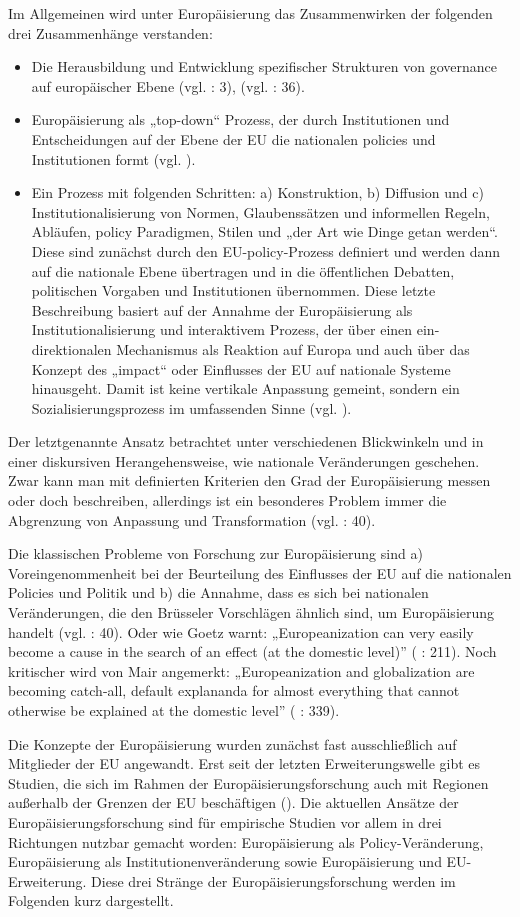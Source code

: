 Im Allgemeinen wird unter Europäisierung das Zusammenwirken der folgenden drei Zusammenhänge verstanden: 
\begin{itemize} \itemsep1pt \parskip0pt 
\item Die Herausbildung und Entwicklung spezifischer Strukturen von governance auf europäischer Ebene (vgl. \cite{risseetal} : 3), (vgl. \cite{radpas} : 36).
\item Europäisierung als „top-down“ Prozess, der durch Institutionen und Entscheidungen auf der Ebene der EU die nationalen policies und Institutionen formt (vgl. \cite{herit}).
\item Ein Prozess mit folgenden Schritten: a) Konstruktion, b) Diffusion und c) Institutionalisierung von Normen, Glaubenssätzen und informellen Regeln, Abläufen, policy Paradigmen, Stilen und „der Art wie Dinge getan werden“. Diese sind zunächst durch den EU-policy-Prozess definiert und werden dann auf die nationale Ebene übertragen und in die öffentlichen Debatten, politischen Vorgaben und Institutionen übernommen. Diese letzte Beschreibung basiert auf der Annahme der Europäisierung als Institutionalisierung und interaktivem Prozess, der über einen ein-direktionalen Mechanismus als Reaktion auf Europa und auch über das Konzept des „impact“ oder Einflusses der EU auf nationale Systeme hinausgeht. Damit ist keine vertikale Anpassung gemeint, sondern ein Sozialisierungsprozess im umfassenden Sinne (vgl. \cite{fearad03, olsen}).
\end{itemize}
Der letztgenannte Ansatz betrachtet unter verschiedenen Blickwinkeln und in einer diskursiven Herangehensweise, wie nationale Veränderungen geschehen. Zwar kann man mit definierten Kriterien den Grad der Europäisierung messen oder doch beschreiben, allerdings ist ein besonderes Problem immer die Abgrenzung von Anpassung und Transformation (vgl. \cite{radpas} : 40).\par
Die klassischen Probleme von Forschung zur Europäisierung sind a) Voreingenommenheit bei der Beurteilung des Einflusses der EU auf die nationalen Policies und Politik und b) die Annahme, dass es sich bei nationalen Veränderungen, die den Brüsseler Vorschlägen ähnlich sind, um Europäisierung handelt (vgl. \cite{radpas} : 40). Oder wie Goetz warnt: „Europeanization can very easily become a cause in the search of an effect (at the domestic level)” (\cite{goetz01a} : 211). Noch kritischer wird von Mair angemerkt: „Europeanization and globalization are becoming catch-all, default explananda for almost everything that cannot otherwise be explained at the domestic level” (\cite{mair} : 339).\par
Die Konzepte der Europäisierung wurden zunächst fast ausschließlich auf Mitglieder der EU angewandt. Erst seit der letzten Erweiterungswelle gibt es Studien, die sich im Rahmen der Europäisierungsforschung auch mit Regionen außerhalb der Grenzen der EU beschäftigen (\cite{lipumwes, grab03, papadi, lavenex, schsed05b,schsed05c}). Die aktuellen Ansätze der Europäisierungsforschung sind für empirische Studien vor allem in drei Richtungen nutzbar gemacht worden: Europäisierung als Policy-Veränderung, Europäisierung als Institutionenveränderung sowie Europäisierung und EU-Erweiterung. Diese drei Stränge der Europäisierungsforschung werden im Folgenden kurz dargestellt.
